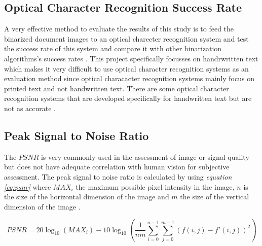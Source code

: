 \documentclass[11pt]{article}
\begin{document}
		\subsection{Optical Character Recognition Success Rate}
			A very effective method to evaluate the results of this study is to feed the binarized document images to an optical charecter recognition system and test the success rate of this system and compare it with other binarization algorithms's success rates \cite{chen2017broken}. This project specifically focusses on handrwritten text which makes it very difficult to use optical character recognition systems as an evaluation method since optical characacter recognition systems mainly focus on printed text and not handwritten text. There are some optical character recognition systems that are developed specifically for handwritten text but are not as accurate \cite{ntirogiannis2013performance}.

		\subsection{Peak Signal to Noise Ratio}
		The $PSNR$ is very commonly used in the assessment of image or signal quality but does not have adequate correlation with human vision for subjective assessment. The peak signal to noise ratio is calculated by using \textit{equation \ref{eq:psnr}} where $MAX_i$ the maximum possible pixel intensity in the image, $n$ is the size of the horizontal dimension of the image and $m$ the size of the vertical dimension of the image \cite{liu2017free}.

		\begin{large}
		\begin{equation}\label{eq:psnr}
		 \displaystyle{PSNR = \displaystyle20\log_{10}(MAX_i) - 10 \log_{10}(\displaystyle\frac{1}{nm}\sum_{i=0}^{n-1}\sum_{j=0}^{m-1}(f(i,j)-f'(i,j))^2)}
		\end{equation}
		\end{large}
\end{document}
